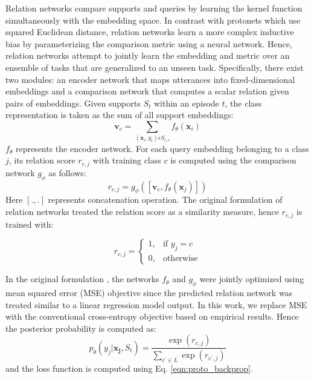 Relation networks compare supports and queries by learning the kernel function simultaneously with the embedding space\cite{sung2018learning}. In contrast with protonets which use squared Euclidean distance, relation networks learn a more complex inductive bias by parameterizing the comparison metric using a neural network. 
Hence, relation networks attempt to jointly learn the embedding and metric over an ensemble of tasks that are generalized to an unseen task. Specifically, there exist two modules: an encoder network that maps utterances into fixed-dimensional embeddings and a comparison network that computes a scalar relation given pairs of embeddings. Given supports $S_t$ within an episode $t$, the class representation is taken as the sum of all support embeddings:
\begin{equation}
\label{eqn:relation_encoder}
    \mathbf{v}_c = \sum_{(\mathbf{x}_i,y_{i})\epsilon S_{t,c}} f_{\theta}(\mathbf{x}_i)
\end{equation}
$f_{\theta}$ represents the encoder network. For each query embedding belonging to a class $j$, its relation score $r_{c,j}$ with training class $c$ is computed using the comparison network $g_{\phi}$ as follows:
\begin{equation}
\label{eqn:relation_relation}
    r_{c,j} = g_{\phi} ([ \mathbf{v}_c, f_{\theta} (\mathbf{x}_j) ])
\end{equation}
Here $[.,.]$ represents concatenation operation. The original formulation of relation networks \cite{sung2018learning} treated the relation score as a similarity measure, hence $r_{c,j}$ is trained with:

\begin{equation}
    r_{c,j}= 
\begin{cases}
    1, & \text{if } y_j = c\\
    0, & \text{otherwise}
\end{cases}
\end{equation}

In the original formulation \cite{sung2018learning}, the networks $f_\theta$ and $g_\phi$ were jointly optimized using mean squared error (MSE) objective since the predicted relation network was treated similar to a linear regression model output. In this work, we replace MSE with the conventional cross-entropy objective based on empirical results. Hence the posterior probability is computed as:
\begin{equation}
\label{softmax-eq}
    p_\theta(y_j| \mathbf{x_j}, S_t)=\frac{\exp \left(  r_{c,j}   \right)}{\sum_{c^{\prime} \in L} \exp \left(    r_{c^{\prime},j}     \right)}
\end{equation}
and the loss function is computed using Eq. \ref{eqn:proto_backprop}.

